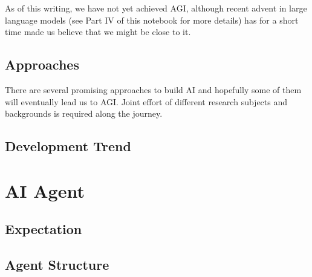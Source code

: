 As of this writing, we have not yet achieved AGI, although recent advent in large language models (see Part IV of this notebook for more details) has for a short time made us believe that we might be close to it.

\subsection{Approaches}

There are several promising approaches to build AI and hopefully some of them will eventually lead us to AGI. Joint effort of different research subjects and backgrounds is required along the journey.


\subsection{Development Trend}

\section{AI Agent}

\subsection{Expectation}

\subsection{Agent Structure}